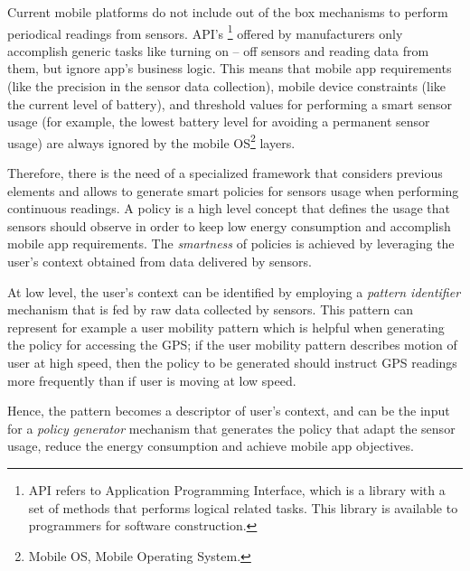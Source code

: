 \documentclass{report}
\begin{document}
Current mobile platforms do not include out of the box mechanisms to perform periodical readings from sensors.
API's \footnote{API refers to Application Programming Interface, which is a library with a set of methods that performs logical related tasks. This library is available to programmers for software construction.} offered by manufacturers only accomplish generic tasks like turning on -- off sensors and reading data from them, but ignore app's business logic.
This means that mobile app requirements (like the precision in the sensor data collection), mobile device constraints (like the current level of battery), and threshold values for performing a smart sensor usage (for example, the lowest battery level for avoiding a permanent sensor usage) are always ignored by the mobile OS\footnote{Mobile OS, Mobile Operating System.} layers.

Therefore, there is the need of a specialized framework that considers previous elements and allows to generate smart policies for sensors usage when performing continuous readings.
A policy is a high level concept that defines the usage that sensors should observe in order to keep low energy consumption and accomplish mobile app requirements.
The \emph{smartness} of policies is achieved by leveraging the user's context obtained from data delivered by sensors.

At low level, the user's context can be identified by employing a \emph{pattern identifier} mechanism that is fed by raw data collected by sensors.
This pattern can represent for example a user mobility pattern which is helpful when generating the policy for accessing the GPS;
if the user mobility pattern describes motion of user at high speed, then the policy to be generated should instruct GPS readings more frequently than if user is moving at low speed.

Hence, the pattern becomes a descriptor of user's context, and can be the input for a \emph{policy generator} mechanism that generates the policy that adapt the sensor usage, reduce the energy consumption and achieve mobile app objectives.
\end{document}
